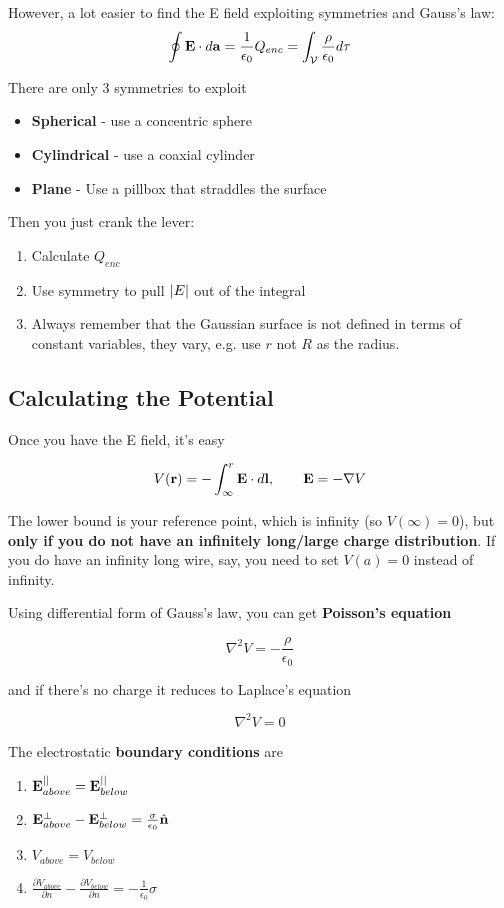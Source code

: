 \documentclass{article}
\newcommand{\vh}[1]{\hat{\vb{#1}}}
\begin{document}
However, a lot easier to find the E field exploiting symmetries and Gauss's law:
$$
\oint \vb{E} \cdot d\vb{a} = \frac{1}{\epsilon_0} Q_{enc} = \int_\mathcal{V} \frac{\rho}{\epsilon_0} d\tau
$$

There are only 3 symmetries to exploit
\begin{itemize}
    \item \textbf{Spherical} - use a concentric sphere
    \item \textbf{Cylindrical} - use a coaxial cylinder
    \item \textbf{Plane} - Use a pillbox that straddles the surface
\end{itemize}

Then you just crank the lever:
\begin{enumerate}
    \item Calculate $Q_{enc}$
    \item Use symmetry to pull $\abs{E}$ out of the integral 
    \item Always remember that the Gaussian surface is not defined in terms of constant variables, they vary, e.g. use $r$ not $R$ as the radius.
\end{enumerate}

\subsection{Calculating the Potential}
Once you have the E field, it's easy 

$$
V(\vb{r}) = - \int_{\infty}^{r} \vb{E} \cdot d\vb{l}, \qquad \vb{E} = - \nabla V
$$

The lower bound is your reference point, which is infinity (so $V(\infty) = 0$), but \textbf{only if you do not have an infinitely long/large charge distribution}.  If you do have an infinity long wire, say, you need to set $V(a) = 0$ instead of infinity.

Using differential form of Gauss's law, you can get \textbf{Poisson's equation}

$$
\nabla^2 V = -\frac{\rho}{\epsilon_0}
$$

and if there's no charge it reduces to Laplace's equation

$$
\nabla^2 V = 0
$$

The electrostatic \textbf{boundary conditions} are

\begin{enumerate}
    \item $\vb{E}^{||}_{above} = \vb{E}^{||}_{below}$
    \item $\vb{E}^{\perp}_{above} - \vb{E}^{\perp}_{below} = \frac{\sigma}{\epsilon_0}\vh{n}$
    \item $V_{above} = V_{below}$
    \item $\frac{\partial V_{above}}{\partial n} - \frac{\partial V_{below}}{\partial n}  = -\frac{1}{\epsilon_0}\sigma $
\end{enumerate}
\end{document}
